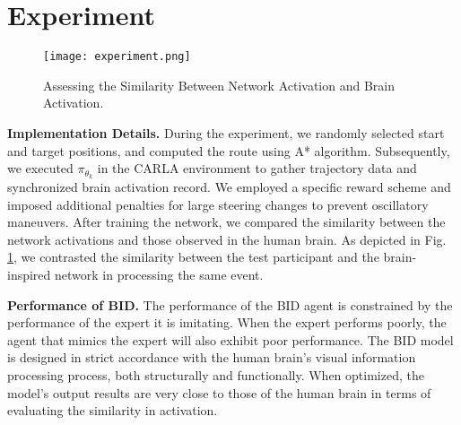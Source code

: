 \section{Experiment}
\begin{figure}[t]
	\centering
	\texttt{[image: experiment.png]}
	
	\caption{Assessing the Similarity Between Network Activation and Brain Activation.}
	\label{fig:fig3}
\end{figure}
\label{sec:experiment}
\hspace{1pc}\textbf{\textsf{Implementation Details.}} During the experiment, we randomly selected start and target positions, and computed the route using A* algorithm. Subsequently, we executed $\pi_{\theta_{k}}$ in the CARLA \cite{Dosovitskiy17} environment to gather trajectory data and synchronized brain activation record. We employed a specific reward scheme and imposed additional penalties for large steering changes to prevent oscillatory maneuvers. After training the network, we compared the similarity between the network activations and those observed in the human brain. As depicted in Fig. \ref{fig:fig3}, we contrasted the similarity between the test participant and the brain-inspired network in processing the same event.

\textbf{\textsf{Performance of BID.}} The performance of the BID agent is constrained by the performance of the expert it is imitating. When the expert performs poorly, the agent that mimics the expert will also exhibit poor performance. The BID model is designed in strict accordance with the human brain's visual information processing process, both structurally and functionally. When optimized, the model's output results are very close to those of the human brain in terms of evaluating the similarity in activation. 